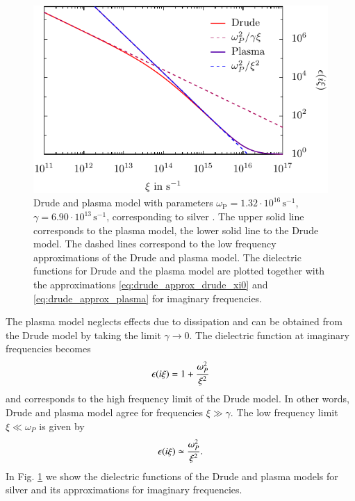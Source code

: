 \begin{figure}
\begin{center}
\includegraphics[scale=1]{plots/drude_log.pdf}
\end{center}

\caption{Drude and plasma model with parameters
$\omega_\text{P}=1.32\cdot10^{16} \, \mathrm{s}^{-1}$, $\gamma=6.90\cdot10^{13}
\, \mathrm{s}^{-1}$, corresponding to silver \cite{PhysRevB.65.165432}. The
upper solid line corresponds to the plasma model, the lower solid line to the
Drude model. The dashed lines correspond to the low frequency approximations of
the Drude and plasma model. The dielectric functions for Drude and the plasma
model are plotted together with the approximations
\eqref{eq:drude_approx_drude_xi0} and \eqref{eq:drude_approx_plasma} for
imaginary frequencies.}
\label{fig:optical_properties_drudeplasma}
\end{figure}

The plasma model neglects effects due to dissipation and can be obtained from
the Drude model by taking the limit $\gamma\to0$. The dielectric function at
imaginary frequencies becomes
\begin{equation}
\epsilon(i\xi) = 1 + \frac{\omega_P^2}{\xi^2}
\end{equation}
and corresponds to the high frequency limit of the Drude model. In other words,
Drude and plasma model agree for frequencies $\xi\gg\gamma$.
The low frequency limit $\xi\ll\omega_P$ is given by
\begin{equation}
\label{eq:drude_approx_plasma}
\epsilon(i\xi) \simeq \frac{\omega_P^2}{\xi^2}.
\end{equation}
In Fig. \ref{fig:optical_properties_drudeplasma} we show the dielectric
functions of the Drude and plasma models for silver and its approximations for
imaginary frequencies.


